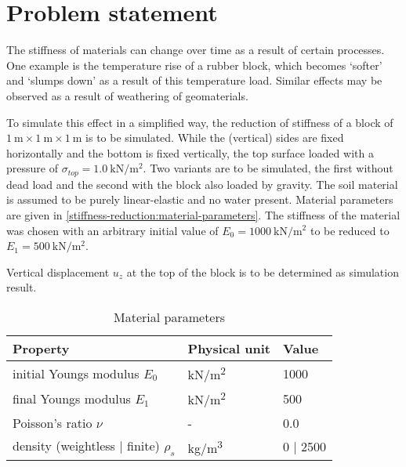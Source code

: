 \section{Problem statement}

The stiffness of materials can change over time as a result of certain
processes. One example is the temperature rise of a rubber block, which becomes
‘softer’ and ‘slumps down’ as a result of this temperature load. Similar
effects may be observed as a result of weathering of geomaterials.

To simulate this effect in a simplified way, the reduction of stiffness of a
block of $\SI{1}{\metre} \times \SI{1}{\metre} \times \SI{1}{\metre}$ is to be
simulated. While the (vertical) sides are fixed horizontally and the bottom is
fixed vertically, the top surface loaded with a pressure of $\sigma_{top} =
    \SI[per-mode = symbol]{1.0}{\kilo\newton\per\square\metre}$. Two variants are
to be simulated, the first without dead load and the second with the block also
loaded by gravity. The soil material is assumed to be purely linear-elastic and
no water present. Material parameters are given in
\autoref{stiffness-reduction:material-parameters}. The stiffness of the
material was chosen with an arbitrary initial value of $E_0 = \SI[per-mode =
        symbol]{1000}{\kilo\newton\per\square\metre}$ to be reduced to $E_1 =
    \SI[per-mode = symbol]{500}{\kilo\newton\per\square\metre}$.

Vertical displacement $u_z$ at the top of the block is to be determined as
simulation result.

\begin{table}[htbp]
    \centering
    \caption{Material parameters}
    \label{stiffness-reduction:material-parameters}
    \begin{tabularx}{\textwidth}{XYY}

        \hline

        Property                                     & Physical unit                & Value      \\

        \hline

        initial Youngs modulus $E_0$                 & \si[per-mode =
        symbol]{\kilo\newton\per\square\metre}       & \SI{1000}{}                               \\

        final Youngs modulus $E_1$                   & \si[per-mode =
        symbol]{\kilo\newton\per\square\metre}       & \SI{500}{}                                \\

        Poisson's ratio $\nu$                        & -                            & \SI{0.0}{} \\

        density (weightless $\vert$ finite) $\rho_s$ & \si[per-mode =
        symbol]{\kilogram\per\cubic\metre}           & \SI{0}{} $\vert$ \SI{2500}{}              \\

        \hline
    \end{tabularx}
\end{table}

